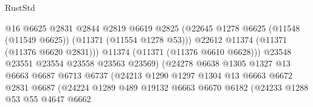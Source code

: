 \begin{lexlean}{RustStd}
\begin{coremodule}
                                          @16
                                          @6625
                                          @2831
                                          @2844
                                          @2819
                                          @6619
                                          @2825
                                          (@22645
                                            @1278
                                            @6625
                                            (@11548 (@11549 @6625))
                                            (@11371 (@11554 @1278 @53)))
                                          @22612
                                          @11374
                                          (@11371 (@11376 @6620 @2831)))
                                        @11374
                                        (@11371 (@11376 @6610 @6628)))
                                      @23548
                                      @23551
                                      @23554
                                      @23558
                                      @23563
                                      @23569)
                                    (@24278
                                      @6638
                                      @1305
                                      @1327
                                      @13
                                      @6663
                                      @6687
                                      @6713
                                      @6737
                                      (@24213
                                        @1290
                                        @1297
                                        @1304
                                        @13
                                        @6663
                                        @6672
                                        @2831
                                        @6687
                                        (@24224
                                          @1289
                                          @489
                                          @19132
                                          @6663
                                          @6670
                                          @6182
                                          (@24233
                                            @1288
                                            @53
                                            @55
                                            @4647
                                            @6662

\end{coremodule}
\end{lexlean}
